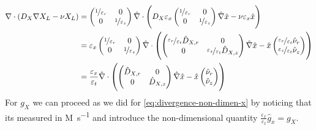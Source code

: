 \documentclass[11pt]{article}
\begin{document}
\begin{align}
    \nabla \cdot ( D_X \nabla X_L - \nu X_L  )
    &=
    \begin{pmatrix}
        \nicefrac{1}{\varepsilon_r} & 0 \\
        0 & \nicefrac{1}{\varepsilon_z}
    \end{pmatrix}
    \hat{\nabla}
    \cdot
    \left( 
        D_X
        \varepsilon_x
        \begin{pmatrix}
        \nicefrac{1}{\varepsilon_r} & 0 \\
        0 & \nicefrac{1}{\varepsilon_z}
    \end{pmatrix}
    \hat{\nabla} \hat{x} - \nu \varepsilon_x \hat{x}
    \right)
    \notag
    \\
    &= \varepsilon_x
    \begin{pmatrix}
        \nicefrac{1}{\varepsilon_r} & 0 \\
        0 & \nicefrac{1}{\varepsilon_z}
    \end{pmatrix}
    \hat{\nabla}
    \cdot
    \left( 
        \begin{pmatrix}
         \nicefrac{\varepsilon_r}{\varepsilon_t} \hat{D}_{X,r} & 0 
         \\
        0 &  \nicefrac{\varepsilon_z}{\varepsilon_t} \hat{D}_{X,z}
    \end{pmatrix}
    \hat{\nabla} \hat{x} - \hat{x}
    \begin{pmatrix}
         \nicefrac{\varepsilon_r}{\varepsilon_t} \hat{\nu}_{r} 
         \\
        \nicefrac{\varepsilon_z}{\varepsilon_t} \hat{\nu}_{z}
    \end{pmatrix}
    \right)
    \notag
    \\
    &= \frac{\varepsilon_x}{\varepsilon_t}
    \hat{\nabla}
    \cdot
    \left( 
        \begin{pmatrix}
         \hat{D}_{X,r} & 0 
         \\
        0 &  \hat{D}_{X,z}
    \end{pmatrix}
    \hat{\nabla} \hat{x} - \hat{x}
    \begin{pmatrix}
         \hat{\nu}_{r} 
         \\
        \hat{\nu}_{z}
    \end{pmatrix}
    \right)
    \label{eq:divergence-non-dimen-x}
\end{align}
For \(g_X\) we can proceed as we did for \eqref{eq:divergence-non-dimen-x} by noticing that its measured in \si{M.s^{-1}} and introduce the non-dimensional quantity \( \frac{\varepsilon_x}{\varepsilon_t}\hat{g}_{x} = g_X\).
\end{document}
